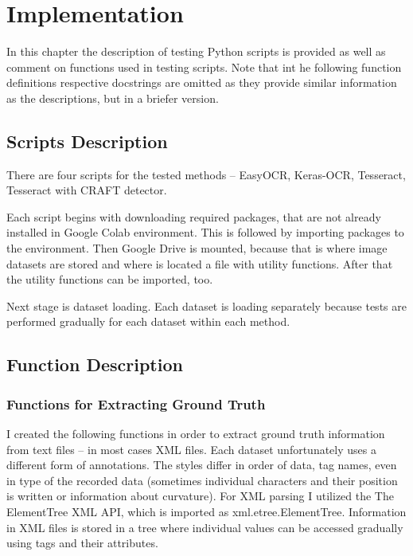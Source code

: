 \chapter{Implementation}

In this chapter the description of testing Python scripts is provided as well as comment on functions used in testing scripts. Note that int he following function definitions respective docstrings are omitted as they provide similar information as the descriptions, but in a 	briefer version.      

\section{Scripts Description}

There are four scripts for the tested methods -- EasyOCR, Keras-OCR, Tesseract, Tesseract with CRAFT detector. 

Each script begins with downloading required packages, that are not already installed in Google Colab environment. This is followed by importing packages to the environment. Then Google Drive is mounted, because that is where image datasets are stored and where is located a file with utility functions. After that the utility functions can be imported, too.

Next stage is dataset loading. Each dataset is loading separately because tests are performed gradually for each dataset within each method.


\section{Function Description}



\subsection*{Functions for Extracting Ground Truth}

I created the following functions in order to extract ground truth information from  text files -- in most cases XML files. Each dataset unfortunately uses a different form of annotations. The styles differ in order of data, tag names, even in type of the recorded data (sometimes individual characters and their position is written or information about curvature). For XML parsing I utilized the The ElementTree XML API, which is imported as xml.etree.ElementTree. Information in XML files is stored in a tree where individual values can be accessed gradually using tags and their attributes.

